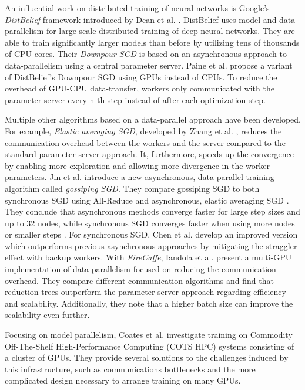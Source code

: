 \documentclass[conference,compsoc,a4paper]{IEEEtran}
\begin{document}
An influential work on distributed training of neural networks is Google’s \emph{DistBelief} framework introduced by Dean et al. \cite{dean2012-Large-scale-distributed}.
DistBelief uses model and data parallelism for large-scale distributed training of deep neural networks.
They are able to train significantly larger models than before by utilizing tens of thousands of CPU cores.
Their \emph{Downpour SGD} is based on an asynchronous approach to data-parallelism using a central parameter server.
%
Paine et al. \cite{paine2013-GPU-async-SGD} propose a variant of DistBelief's Downpour SGD using GPUs instead of CPUs.
To reduce the overhead of GPU-CPU data-transfer, workers only communicated with the parameter server every n-th step instead of after each optimization step.

Multiple other algorithms based on a data-parallel approach have been developed.
%
For example, \emph{Elastic averaging SGD}, developed by Zhang et al. \cite{zhang2015-Elastic-AvgSGD}, reduces the communication overhead between the workers and the server compared to the standard parameter server approach.
It, furthermore, speeds up the convergence by enabling more exploration and allowing more divergence in the worker parameters.
%
Jin et al. \cite{jin2016-How-to-scale} introduce a new asynchronous, data parallel training algorithm called \emph{gossiping SGD}.
They compare gossiping SGD to both synchronous SGD using All-Reduce and asynchronous, elastic averaging SGD \cite{zhang2015-Elastic-AvgSGD}.
They conclude that asynchronous methods converge faster for large step sizes and up to 32 nodes, while synchronous SGD converges faster when using more nodes or smaller steps \cite{jin2016-How-to-scale}.
%
For synchronous SGD, Chen et al. \cite{chen2016-Revisiting-distributed-synchronous-SGD} develop an improved version which outperforms previous asynchronous approaches by mitigating the straggler effect with backup workers.
%
With \emph{FireCaffe}, Iandola et al. \cite{iandola2016-Firecaffe} present a multi-GPU implementation of data parallelism focused on reducing the communication overhead.
They compare different communication algorithms and find that reduction trees outperform the parameter server approach regarding efficiency and scalability.
Additionally, they note that a higher batch size can improve the scalability even further.

Focusing on model parallelism, Coates et al. \cite{coates2013-DL-COTS-HPC} investigate training on Commodity Off-The-Shelf High-Performance Computing (COTS HPC) systems consisting of a cluster of GPUs.
They provide several solutions to the challenges induced by this infrastructure, such as communications bottlenecks and the more complicated design necessary to arrange training on many GPUs.
\end{document}
